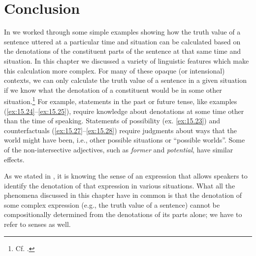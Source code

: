 \section{Conclusion}\label{sec:15.7}
In  we worked through some simple examples showing how the truth value of a sentence uttered at a particular time and situation can be calculated based on the denotations of the constituent parts of the sentence at that same time and situation. In this chapter we discussed a variety of linguistic features which make this calculation more complex. For many of these opaque (or intensional) contexts, we can only calculate the truth value of a sentence in a given situation if we know what the denotation of a constituent would be in some other situation.\footnote{Cf. \citet[204–208]{ChierchiaMcConnell-Ginet1990}.} For example, statements in the past or future tense, like examples (\ref{ex:15.24}--\ref{ex:15.25}), require knowledge about denotations at some time other than the time of speaking. Statements of possibility (ex. \ref{ex:15.23}) and counterfactuals (\ref{ex:15.27}--\ref{ex:15.28}) require judgments about ways that the world might have been, i.e., other possible situations or “possible worlds”. Some of the non-intersective adjectives, such as \textit{former} and \textit{potential}, have similar effects.



As we stated in , it is knowing the sense of an expression that allows speakers to identify the denotation of that expression in various situations. What all the phenomena discussed in this chapter have in common is that the denotation of some complex expression (e.g., the truth value of a sentence) cannot be compositionally determined from the denotations of its parts alone; we have to refer to senses as well.



